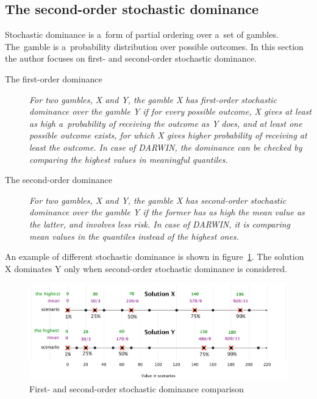 \clearpage{}
\subsection{The second-order stochastic dominance}

Stochastic dominance is a~form of partial ordering over a~set of
gambles. The~gamble is a~probability distribution over possible outcomes. In
this section the author focuses on first- and second-order stochastic
dominance.

\begin{description}
\item[The first-order dominance] \textit{For two gambles, X and Y, the gamble
    X has first-order stochastic dominance over the gamble Y if for every
    possible outcome, X gives at least as high a~probability of receiving the
    outcome as Y does, and at least one possible outcome exists, for which X
    gives higher probability of receiving at least the outcome. In case of
    DARWIN, the dominance can be checked by comparing the highest values in
    meaningful quantiles.}

\item[The second-order dominance] \textit{For two gambles, X and Y, the gamble
    X has second-order stochastic dominance over the gamble Y if the former
    has as high the mean value as the latter, and involves less risk. In case
    of DARWIN, it is comparing mean values in the quantiles instead of the
    highest ones.}
\end{description}

An example of different stochastic dominance is shown in
figure~\ref{stochdom}. The solution X dominates Y only when second-order
stochastic dominance is considered. 

\begin{figure}[h]
  \centering
    \includegraphics[scale=0.55]{img/stochdom}
  \caption{First- and second-order stochastic dominance comparison}
  \label{stochdom}
\end{figure}

